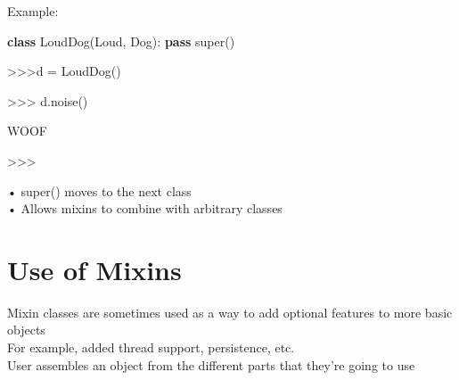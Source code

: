 \documentclass[
  letterpaper,
  DIV=11,
  numbers=noendperiod]{scrreprt}
\newenvironment{Shaded}{\begin{snugshade}}{\end{snugshade}}
\newcommand{\BuiltInTok}[1]{\textcolor[rgb]{0.00,0.23,0.31}{#1}}
\newcommand{\ControlFlowTok}[1]{\textcolor[rgb]{0.00,0.23,0.31}{\textbf{#1}}}
\newcommand{\KeywordTok}[1]{\textcolor[rgb]{0.00,0.23,0.31}{\textbf{#1}}}
\newcommand{\NormalTok}[1]{\textcolor[rgb]{0.00,0.23,0.31}{#1}}
\begin{document}
Example:

\begin{Shaded}
\begin{Highlighting}[]
\KeywordTok{class}\NormalTok{ LoudDog(Loud, Dog):}
    \ControlFlowTok{pass} \BuiltInTok{super}\NormalTok{() }
\end{Highlighting}
\end{Shaded}

\begin{Shaded}
\begin{Highlighting}[]
\NormalTok{\textgreater{}\textgreater{}\textgreater{}d = LoudDog() }
\end{Highlighting}
\end{Shaded}

\begin{Shaded}
\begin{Highlighting}[]
\NormalTok{\textgreater{}\textgreater{}\textgreater{} d.noise() }
\end{Highlighting}
\end{Shaded}

\begin{Shaded}
\begin{Highlighting}[]
\NormalTok{\textquotesingle{}WOOF\textquotesingle{} }
\end{Highlighting}
\end{Shaded}

\begin{Shaded}
\begin{Highlighting}[]
\NormalTok{\textgreater{}\textgreater{}\textgreater{} }
\end{Highlighting}
\end{Shaded}

• super() moves to the next class\\
• Allows mixins to combine with arbitrary classes


\chapter{Use of Mixins}\label{use-of-mixins}

Mixin classes are sometimes used as a way to add optional features to
more basic objects\\
For example, added thread support, persistence, etc.\\
User assembles an object from the different parts that they're going to
use

\end{document}
